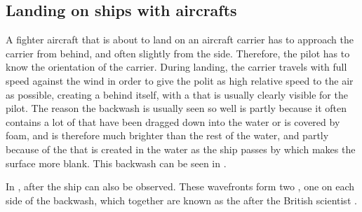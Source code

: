 \subsection{Landing on ships with aircrafts}

A fighter aircraft that is about to land on an aircraft carrier has to approach the carrier from behind, and often slightly from the side. Therefore, the pilot has to know the orientation of the carrier. During landing, the carrier travels with full speed against the wind in order to give the polit as high relative speed to the air as possible, creating a \wake behind itself, with a \backwash that is usually clearly visible for the pilot. The reason the backwash is usually seen so well is partly because it often contains a lot of  that have been dragged down into the water or is covered by foam, and is therefore much brighter than the rest of the water, and partly because of the \turbulence that is created in the water as the ship passes by which makes the surface more blank. This backwash can be seen in .

In ,  after the ship can also be observed. These wavefronts form two , one on each side of the backwash, which together are known as the  after the British scientist .

